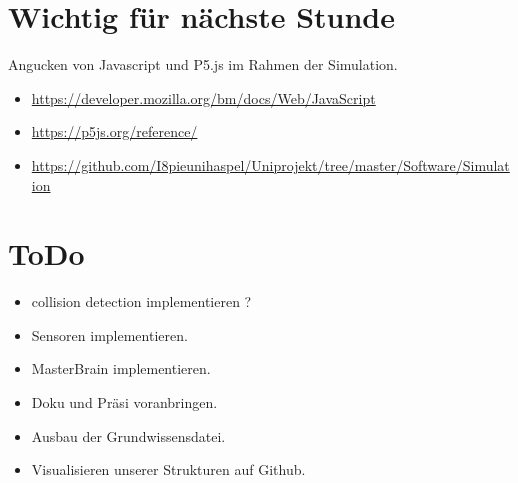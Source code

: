 \documentclass{article}
\begin{document}
\section{Wichtig für nächste Stunde}

Angucken von Javascript und P5.js im Rahmen der Simulation.

\begin{itemize}

\item \url{https://developer.mozilla.org/bm/docs/Web/JavaScript}

\item \url{https://p5js.org/reference/}

\item \url{https://github.com/I8pieunihaspel/Uniprojekt/tree/master/Software/Simulation}

\end{itemize}

\section{ToDo}

\begin{itemize}

\item collision detection implementieren ?

\item Sensoren implementieren.

\item MasterBrain implementieren.

\item Doku und Präsi voranbringen.

\item Ausbau der Grundwissensdatei.

\item Visualisieren unserer Strukturen auf Github.

\end{itemize}
\end{document}
